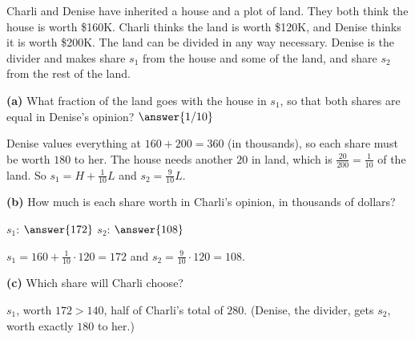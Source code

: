 \documentclass[12pt]{ximera}
\begin{document}
\begin{problem}
Charli and Denise have inherited a house and a plot of land. They both think the house is
worth \$160K. Charli thinks the land is worth \$120K, and Denise thinks it is
worth \$200K. The land can be divided in any way necessary. Denise is the divider and
makes share $s_1$ from the house and some of the land, and share $s_2$ from the rest of the
land.

\begin{prompt}
\textbf{(a)} What fraction of the land goes with the house in $s_1$, so that both shares
are equal in Denise's opinion? $\answer{1/10}$
\begin{feedback}
Denise values everything at $160+200=360$ (in thousands), so each share must be worth
$180$ to her. The house needs another $20$ in land, which is $\frac{20}{200}=\frac1{10}$
of the land. So $s_1=H+\frac1{10}L$ and $s_2=\frac9{10}L$.
\end{feedback}
\end{prompt}

\begin{prompt}
\textbf{(b)} How much is each share worth in Charli's opinion, in thousands of
dollars?

$s_1$: $\answer{172}$ \quad $s_2$: $\answer{108}$
\begin{feedback}
$s_1=160+\frac1{10}\cdot120=172$ and $s_2=\frac9{10}\cdot120=108$.
\end{feedback}
\end{prompt}

\begin{prompt}
\textbf{(c)} Which share will Charli choose?
\begin{multipleChoice}
\end{multipleChoice}
\begin{feedback}
$s_1$, worth $172>140$, half of Charli's total of $280$. (Denise, the divider, gets $s_2$, worth exactly $180$ to her.)
\end{feedback}
\end{prompt}
\end{problem}
\end{document}
